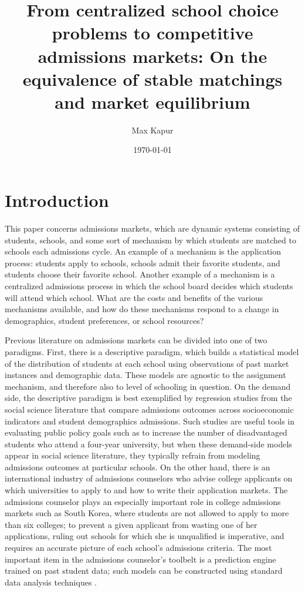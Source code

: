 \documentclass[12pt]{article}
\title{From centralized school choice problems to competitive admissions markets: On the equivalence of stable matchings and market equilibrium}
\date{\today}
\author{Max Kapur}
\theoremstyle{definition}
\begin{document}
\maketitle

\pagebreak
\tableofcontents

\pagebreak
\section{Introduction}
This paper concerns admissions markets, which are dynamic systems consisting of students, schools, and some sort of mechanism by which students are matched to schools each admissions cycle. An example of a mechanism is the application process: students apply to schools, schools admit their favorite students, and students choose their favorite school. Another example of a mechanism is a centralized admissions process in which the school board decides which students will attend which school. What are the costs and benefits of the various mechanisms available, and how do these mechanisms respond to a change in demographics, student preferences, or school resources?

Previous literature on admissions markets can be divided into one of two paradigms. First, there is a descriptive paradigm, which builds a statistical model of the distribution of students at each school using observations of past market instances and demographic data. These models are agnostic to the assignment mechanism, and therefore also to level of schooling in question. On the demand side, the descriptive paradigm is best exemplified by regression studies from the social science literature that compare admissions outcomes across socioeconomic indicators and student demographics \parencite[][]{roleofSESinSAT, consequencesofstructuralracism, applicantdistsinNYC} admissions. Such studies are useful tools in evaluating public policy goals such as to increase the number of disadvantaged students who attend a four-year university, but when these demand-side models appear in social science literature, they typically refrain from modeling admissions outcomes at particular schools. On the other hand, there is an international industry of admissions counselors who advise college applicants on which universities to apply to and how to write their application markets. The admissions counselor plays an especially important role in college admissions markets such as South Korea, where students are not allowed to apply to more than six colleges; to prevent a given applicant from wasting one of her applications, ruling out schools for which she is unqualified is imperative, and requires an accurate picture of each school's admissions criteria. The most important item in the admissions counselor's toolbelt is a prediction engine trained on past student data; such models can be constructed using standard data analysis techniques \parencite[][]{asimulationapproachtopredictingcollegeadmissions}. 
\end{document}
